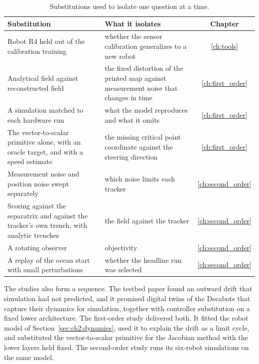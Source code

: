 \begin{table}[htbp]
\centering
\caption{Substitutions used to isolate one question at a time.}
\label{tab:ch2:substitution}
\small
\begin{tabular}{>{\raggedright\arraybackslash}p{5.2cm} >{\raggedright\arraybackslash}p{7.0cm} c}
\hline
Substitution & What it isolates & Chapter \\
\hline
Robot R4 held out of the calibration training & whether the sensor calibration generalizes to a new robot & \ref{ch:tools} \\
Analytical field against reconstructed field & the fixed distortion of the printed map against measurement noise that changes in time & \ref{ch:first_order} \\
A simulation matched to each hardware run & what the model reproduces and what it omits & \ref{ch:first_order} \\
The vector-to-scalar primitive alone, with an oracle target, and with a speed estimate & the missing critical point coordinate against the steering direction & \ref{ch:first_order} \\
Measurement noise and position noise swept separately & which noise limits each tracker & \ref{ch:second_order} \\
Scoring against the separatrix and against the tracker's own trench, with analytic trenches & the field against the tracker & \ref{ch:second_order} \\
A rotating observer & objectivity & \ref{ch:second_order} \\
A replay of the ocean start with small perturbations & whether the headline run was selected & \ref{ch:second_order} \\
\hline
\end{tabular}
\end{table}

The studies also form a sequence. The testbed paper found an outward drift
that simulation had not predicted, and it promised digital twins of the
Decabots that capture their dynamics for simulation, together with
controller substitution on a fixed lower architecture. The first-order
study delivered both. It fitted the robot model of
Section~\ref{sec:ch2:dynamics}, used it to explain the drift as a limit
cycle, and substituted the vector-to-scalar primitive for the Jacobian
method with the lower layers held fixed. The second-order study runs its
six-robot simulations on the same model.
